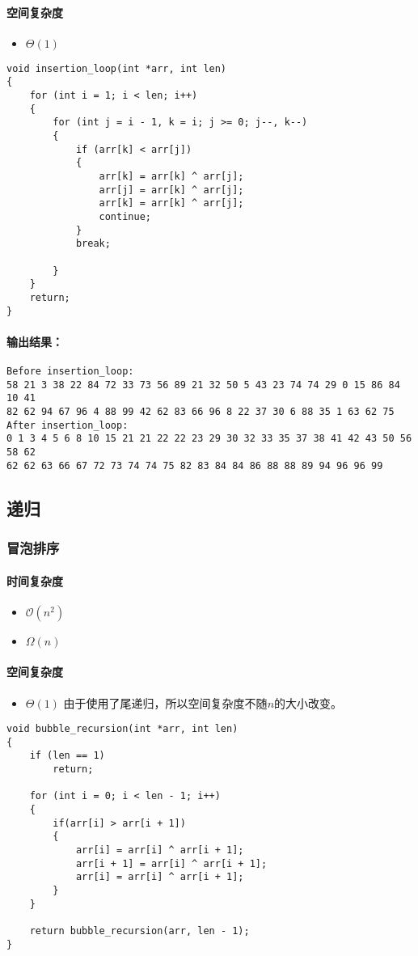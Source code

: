 \documentclass[UTF8]{ctexart}
\begin{document}
\paragraph{空间复杂度}
\begin{itemize}
	\item $\Theta(1)$
\end{itemize}
\begin{lstlisting}
void insertion_loop(int *arr, int len)
{
	for (int i = 1; i < len; i++)
	{
		for (int j = i - 1, k = i; j >= 0; j--, k--)
		{
			if (arr[k] < arr[j])
			{
				arr[k] = arr[k] ^ arr[j];
				arr[j] = arr[k] ^ arr[j];
				arr[k] = arr[k] ^ arr[j];
				continue;
			}
			break;

		}
	}
	return; 
}
\end{lstlisting}
\paragraph{输出结果：}
\begin{lstlisting}
Before insertion_loop:
58 21 3 38 22 84 72 33 73 56 89 21 32 50 5 43 23 74 74 29 0 15 86 84 10 41 
82 62 94 67 96 4 88 99 42 62 83 66 96 8 22 37 30 6 88 35 1 63 62 75 
After insertion_loop:
0 1 3 4 5 6 8 10 15 21 21 22 22 23 29 30 32 33 35 37 38 41 42 43 50 56 58 62 
62 62 63 66 67 72 73 74 74 75 82 83 84 84 86 88 88 89 94 96 96 99
\end{lstlisting}
\subsection{递归}
\subsubsection{冒泡排序}
\paragraph{时间复杂度}
\begin{itemize}
	\item $\mathcal{O}(n^2)$
	\item $\Omega(n)$
\end{itemize}
\paragraph{空间复杂度}
\begin{itemize}
	\item $\Theta(1)$ 由于使用了尾递归，所以空间复杂度不随$n$的大小改变。
\end{itemize}
\begin{lstlisting}
void bubble_recursion(int *arr, int len)
{
	if (len == 1)
		return;

	for (int i = 0; i < len - 1; i++)
	{
		if(arr[i] > arr[i + 1])
		{
			arr[i] = arr[i] ^ arr[i + 1];
			arr[i + 1] = arr[i] ^ arr[i + 1];
			arr[i] = arr[i] ^ arr[i + 1];
		}	
	}

	return bubble_recursion(arr, len - 1);
}
\end{lstlisting}
\end{document}

